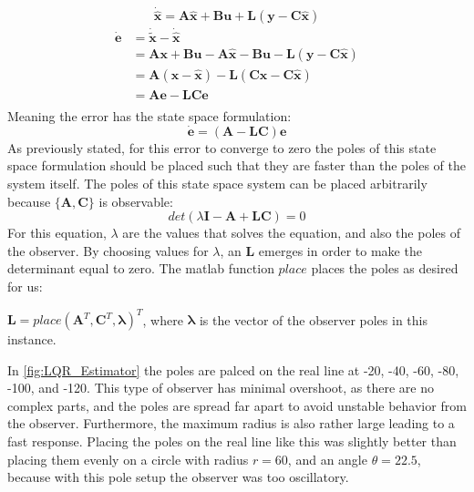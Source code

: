 \begin{equation*}
  \dot{\hat{\bm{x}}} = \bm{A}\hat{\bm{x}}+\bm{B}\bm{u} + \bm{L}(\bm{y}
  - \bm{C}\hat{\bm{x}})
\end{equation*}
\begin{align*}
  \dot{\bm{e}} &= \dot{\bm{\tilde{x}}} - \dot{\hat{\bm{x}}} \\
               &= \bm{Ax} + \bm{Bu} - \bm{A}\hat{\bm{x}} - \bm{Bu} - \bm{L}(\bm{y}- \bm{C}\hat{\bm{x}}) \\
               &= \bm{A}(\bm{x} - \hat{\bm{x}}) - \bm{L}(\bm{C}\bm{x}- \bm{C}\hat{\bm{x}}) \\
               &= \bm{Ae} - \bm{LCe} \\
\end{align*}
Meaning the error has the state space formulation:
\begin{equation}
  \dot{\bm{e}} = (\bm{A} - \bm{LC})\bm{e}
\end{equation}
As previously stated, for this error to converge to zero the poles of this state space formulation should be placed such that they are
faster than the poles of the system itself. The poles of this state
space system can be placed arbitrarily because $\{\bm{A},\bm{C}\}$ is
observable:
\begin{equation*}
  det(\lambda\bm{I} - \bm{A} +\bm{LC}) = 0
\end{equation*}
For this equation, $\lambda$ are the values that solves the equation,
and also the poles of the observer. By choosing values for $\lambda$,
an $\bm{L}$ emerges in order to make the determinant equal to
zero. The matlab function $place$ places the poles as desired for us:

$\bm{L} = place(\bm{A}^T,\bm{C}^T,\bm{\lambda})^T$, where
$\bm{\lambda}$ is the vector of the observer poles in this instance.

In \cref{fig:LQR_Estimator} the poles are palced on the real line at -20, -40, -60, -80, -100, and -120. This type of observer has minimal overshoot, as there are no complex parts, and the poles are spread far apart to avoid unstable behavior from the observer. Furthermore, the maximum radius is also rather large leading to a fast response. Placing the poles on the real line like this was slightly better than placing them evenly on a circle with radius $r = 60$, and an angle $\theta = 22.5$, because with this pole setup the observer was too oscillatory.

